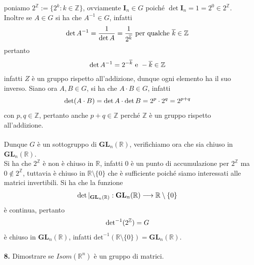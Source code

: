 \documentclass[oneside, 11pt]{amsbook}
\makeatletter
\newcommand{\0}{{(0)}}
\newcommand{\3}{{(3)}}
\theoremstyle{colonplain}
\theoremstyle{colondefinition}
\theoremstyle{colonremark}
\numberwithin{equation}{chapter}
\renewcommand{\proofname}{Dimostrazione}
\renewenvironment{proof}[1][\proofname]{\par
  \pushQED{\qed}%
  \normalfont \topsep6\p@\@plus6\p@\relax
  \trivlist
  \item[\hskip\labelsep\bfseries #1:]\ignorespaces
}{%
  \popQED\endtrivlist\@endpefalse
}
\makeatother
\begin{document}
\begin{proof} poniamo $2^{\mathbb{Z}} := \{ 2^k : k \in \mathbb{Z} \}$, ovviamente $\mathbf{I}_n \in G$ poiché $\det \mathbf{I}_n = 1 = 2^0 \in 2^{\mathbb{Z}}$. Inoltre se $A \in G$ si ha che $A^{-1} \in G$, infatti
\begin{align}
    \det A^{-1} = \frac{1}{\det A} = \frac{1}{2^{\overline{k}}} \text{ per qualche } \overline{k} \in \mathbb{Z} \notag
\end{align}
pertanto
\begin{align}
    \det A^{-1} = 2^{-\overline{k}} \text{ e } -\overline{k} \in \mathbb{Z} \notag
\end{align}
infatti $Z$ è un gruppo rispetto all'addizione, dunque ogni elemento ha il suo inverso. Siano ora $A, B \in G$, si ha che $A \cdot B \in G$, infatti
\begin{align}
    \det (A \cdot B) = \det A \cdot \det B = 2^p \cdot 2^q = 2^{p + q} \notag
\end{align}
con $p, q \in \mathbb{Z}$, pertanto anche $p + q \in \mathbb{Z}$ perché $\mathbb{Z}$ è un gruppo rispetto all'addizione. \\ \\
Dunque $G$ è un sottogruppo di $\mathbf{GL}_n(\mathbb{R})$, verifichiamo ora che sia chiuso in $\mathbf{GL}_n(\mathbb{R})$. \\
Si ha che $2^{\mathbb{Z}}$ è non è chiuso in $\mathbb{R}$, infatti $0$ è un punto di accumulazione per $2^{\mathbb{Z}}$ ma $0 \not\in 2^{\mathbb{Z}}$, tuttavia è chiuso in $\mathbb{R} \setminus \{ 0 \}$ che è sufficiente poiché siamo interessati alle matrici invertibili. Si ha che la funzione
\begin{align}
    \det|_{\mathbf{GL}_n(\mathbb{R})} : \mathbf{GL}_n(\mathbb{R}) \longrightarrow \mathbb{R} \setminus \{ 0 \} \notag
\end{align}
è continua, pertanto
\begin{align}
    \mathrm{det}^{-1}(2^{\mathbb{Z}}) = G \notag
\end{align}
è chiuso in $\mathbf{GL}_n(\mathbb{R})$, infatti $\mathrm{det}^{-1}(\mathbb{R} \setminus \{ 0 \}) = \mathbf{GL}_n(\mathbb{R})$. \\ \\
\end{proof}
\textbf{8.} Dimostrare se $Isom(\mathbb{R}^n)$ è un gruppo di matrici. \\
\end{document}
